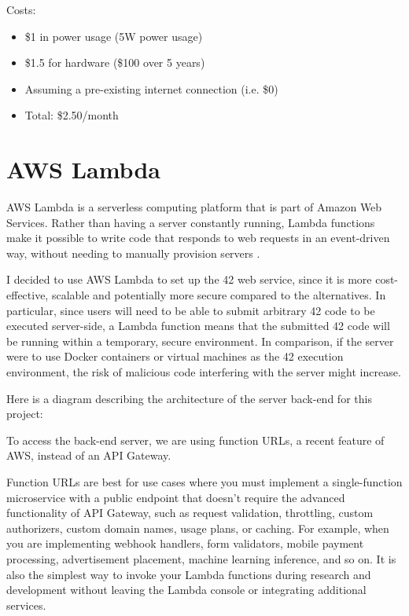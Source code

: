 Costs:

\begin{itemize}
\item \$1 in power usage (5W power usage) \cite{neukirchen-2021}
\item \$1.5 for hardware (\$100 over 5 years)
\item Assuming a pre-existing internet connection (i.e. \$0)
\item Total: \$2.50/month
\end{itemize}

\section{AWS Lambda}

AWS Lambda is a serverless computing platform that is part of Amazon Web Services. Rather than having a server constantly running, Lambda functions make it possible to write code that responds to web requests in an event-driven way, without needing to manually provision servers \cite{amazon-web-services-inc-2022A}.

I decided to use AWS Lambda to set up the 42 web service, since it is more cost-effective, scalable and potentially more secure compared to the alternatives. In particular, since users will need to be able to submit arbitrary 42 code to be executed server-side, a Lambda function means that the submitted 42 code will be running within a temporary, secure environment. In comparison, if the server were to use Docker containers or virtual machines as the 42 execution environment, the risk of malicious code interfering with the server might increase.

Here is a diagram describing the architecture of the server back-end for this project:


To access the back-end server, we are using function URLs, a recent feature of AWS, instead of an API Gateway.

Function URLs are best for use cases where you must implement a single-function microservice with a public endpoint that doesn't require the advanced functionality of API Gateway, such as request validation, throttling, custom authorizers, custom domain names, usage plans, or caching. For example, when you are implementing webhook handlers, form validators, mobile payment processing, advertisement placement, machine learning inference, and so on. It is also the simplest way to invoke your Lambda functions during research and development without leaving the Lambda console or integrating additional services.

